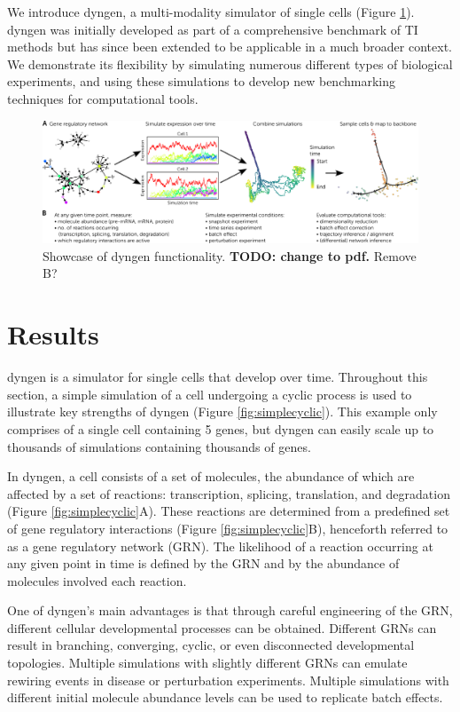 We introduce dyngen, a multi-modality simulator of single cells (Figure \ref{fig:dyngen}).
dyngen was initially developed as part of a comprehensive benchmark of TI methods \cite{saelens_comparisonsinglecelltrajectory_2019} but has since been extended to be applicable in a much broader context.
We demonstrate its flexibility by simulating numerous different types of biological experiments, and using these simulations to develop new benchmarking techniques for computational tools.

\begin{figure}
	\centering
	\includegraphics[width=\linewidth]{fig/dyngen/showcase_3.png} 
	\caption{Showcase of dyngen functionality. \textbf{TODO: change to pdf.} Remove B?} %
	\label{fig:dyngen}
\end{figure}

\section{Results}
dyngen is a simulator for single cells that develop over time. Throughout this section, a simple simulation of a cell undergoing a cyclic process is used to illustrate key strengths of dyngen (Figure \ref{fig:simplecyclic}). This example only comprises of a single cell containing 5 genes, but dyngen can easily scale up to thousands of simulations containing thousands of genes.

In dyngen, a cell consists of a set of molecules, the abundance of which are affected by a set of reactions: transcription, splicing, translation, and degradation (Figure \ref{fig:simplecyclic}A). These reactions are determined from a predefined set of gene regulatory interactions (Figure \ref{fig:simplecyclic}B), henceforth referred to as a gene regulatory network (GRN). The likelihood of a reaction occurring at any given point in time is defined by the GRN and by the abundance of molecules involved each reaction.

One of dyngen's main advantages is that through careful engineering of the GRN, different cellular developmental processes can be obtained. Different GRNs can result in branching, converging, cyclic, or even disconnected developmental topologies. Multiple simulations with slightly different GRNs can emulate rewiring events in disease or perturbation experiments. %
Multiple simulations with different initial molecule abundance levels can be used to replicate batch effects. 

